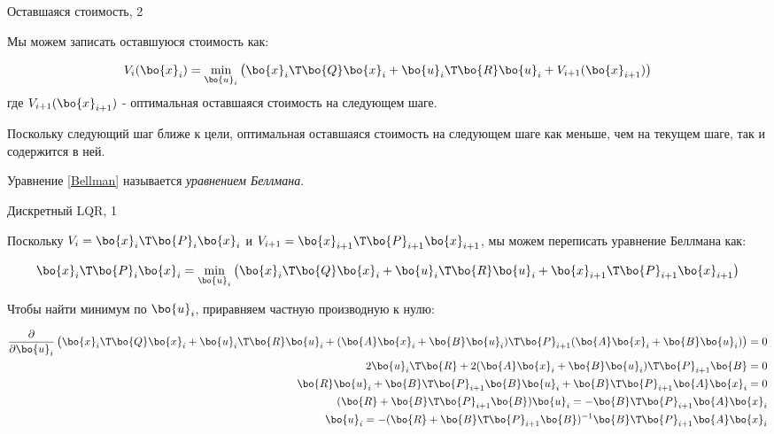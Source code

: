 \documentclass{beamer}
\begin{document}
\begin{frame}{Оставшаяся стоимость, 2}
	\begin{flushleft}
		
		Мы можем записать оставшуюся стоимость как:
		
		\begin{equation}
			\label{Bellman}
			V_i(\bo{x}_i) = \underset{\bo{u}_i}{\text{min}} 
			\left(
			\bo{x}_i\T \bo{Q} \bo{x}_i +  \bo{u}_i\T \bo{R} \bo{u}_i  + V_{i+1}(\bo{x}_{i+1})  
			\right)
		\end{equation}
		где $V_{i+1}(\bo{x}_{i+1})$ - оптимальная оставшаяся стоимость на следующем шаге. 
		
		\bigskip
		
		Поскольку следующий шаг ближе к цели, оптимальная оставшаяся стоимость на следующем шаге как меньше, чем на текущем шаге, так и содержится в ней.
		
		\bigskip
		
		Уравнение \eqref{Bellman} называется \emph{уравнением Беллмана}.
		
	\end{flushleft}
\end{frame}



\begin{frame}{Дискретный LQR, 1}
	\begin{flushleft}
		
		Поскольку $V_i = \bo{x}_i\T \bo{P}_i \bo{x}_i$ и $V_{i+1} = \bo{x}_{i+1}\T \bo{P}_{i+1} \bo{x}_{i+1}$, мы можем переписать уравнение Беллмана как:
		
		\begin{equation}
			\bo{x}_i\T \bo{P}_i \bo{x}_i = \underset{\bo{u}_i}{\text{min}} 
			\left(
			\bo{x}_i\T \bo{Q} \bo{x}_i +  \bo{u}_i\T \bo{R} \bo{u}_i  + \bo{x}_{i+1}\T \bo{P}_{i+1} \bo{x}_{i+1}
			\right)
		\end{equation}
		
		Чтобы найти минимум по $\bo{u}_i$, приравняем частную производную к нулю:
		
		\begin{align*}
			\frac{\partial}{\partial \bo{u}_i}
			\left( 
			\bo{x}_i \T \bo{Q} \bo{x}_i  +  \bo{u}_i\T \bo{R}\bo{u}_i + 
			(\bo{A}\bo{x}_i  + \bo{B}\bo{u}_i)\T \bo{P}_{i+1} (\bo{A}\bo{x}_i  + \bo{B}\bo{u}_i) 
			\right) = 0
			\\
			2\bo{u}_i\T \bo{R}  + 
			2(\bo{A}\bo{x}_i + \bo{B}\bo{u}_i)\T \bo{P}_{i+1} \bo{B} = 0
			\\
			\bo{R}\bo{u}_i + \bo{B}\T \bo{P}_{i+1} \bo{B} \bo{u}_i + \bo{B}\T \bo{P}_{i+1} \bo{A}\bo{x}_i  = 0
			\\
			(\bo{R} + \bo{B}\T \bo{P}_{i+1} \bo{B}) \bo{u}_i = -\bo{B}\T \bo{P}_{i+1} \bo{A}\bo{x}_i 
			\\
			\bo{u}_i = -(\bo{R} + \bo{B}\T \bo{P}_{i+1} \bo{B})^{-1} \bo{B}\T \bo{P}_{i+1} \bo{A}\bo{x}_i 
		\end{align*}
		
		
	\end{flushleft}
\end{frame}
\end{document}

